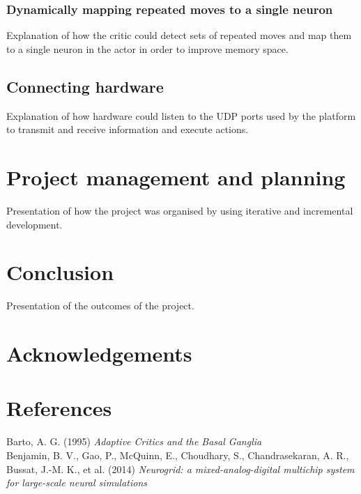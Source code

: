 \documentclass[10pt]{article}
\begin{document}
    \subsubsection{Dynamically mapping repeated moves to a single neuron}

    Explanation of how the critic could detect sets of repeated moves and map them to a single neuron in the actor in order to improve memory space.
    
    \subsection{Connecting hardware}

    Explanation of how hardware could listen to the UDP ports used by the platform to transmit and receive information and execute actions.

    \section{Project management and planning}

    Presentation of how the project was organised by using iterative and incremental development.
    
    \section{Conclusion}

    Presentation of the outcomes of the project.

    \section*{Acknowledgements}
    
    \onecolumn
    \newpage
    
    \section*{References}

    Barto, A. G. (1995) \textit{Adaptive Critics and the Basal Ganglia} \\[-3pt]

    \noindent
    Benjamin, B. V., Gao, P., McQuinn, E., Choudhary, S., Chandrasekaran, A. R., Bussat, J.-M. K., et al. (2014) \textit{ Neurogrid: a mixed-analog-digital multichip system for large-scale neural simulations} \\[-3pt]
\end{document}
